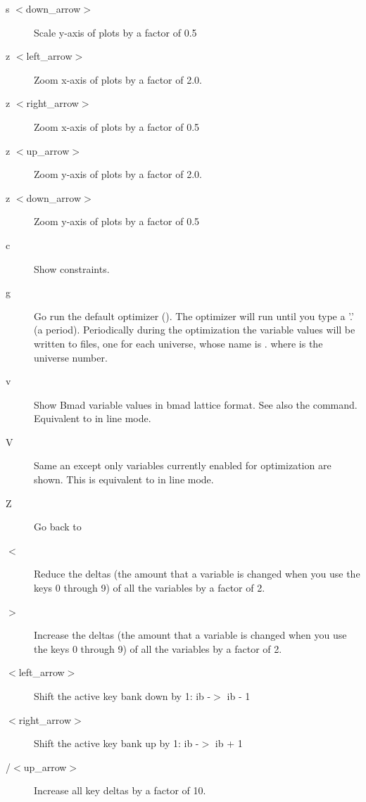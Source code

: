 {\begin{description}
\item[s $<$down\_arrow$>$]
Scale y-axis of plots by a factor of 0.5


\item[z $<$left\_arrow$>$]
Zoom x-axis of plots by a factor of 2.0.

\item[z $<$right\_arrow$>$]
Zoom x-axis of plots by a factor of 0.5

\item[z $<$up\_arrow$>$]
Zoom y-axis of plots by a factor of 2.0.

\item[z $<$down\_arrow$>$]
Zoom y-axis of plots by a factor of 0.5

\item[c]  
Show constraints.

\item[g]
Go run the default optimizer (). The optimizer will run until you type a '.' (a
period).  Periodically during the optimization the variable values will be written to files, one for
each universe, whose name is . where \vn{\#} is the universe number.

\item[v]
Show Bmad variable values in bmad lattice format. See also the  command. Equivalent to
 in line mode.

\item[V] 
Same an  except only variables currently enabled for optimization are shown.
This is equivalent to  in line mode.

\item[Z] 
Go back to 

\item[$<$]
Reduce the deltas (the amount that a variable is changed when you use
the keys 0 through 9) of all the variables by a factor of 2.

\item[$>$]
Increase the deltas (the amount that a variable is changed when you
use the keys 0 through 9) of all the variables by a factor of 2.

\item[$<$left\_arrow$>$]
Shift the active key bank down by 1: ib -$>$ ib - 1

\item[$<$right\_arrow$>$]
Shift the active key bank up by 1: ib -$>$ ib + 1

\item[/$<$up\_arrow$>$]
Increase all key deltas by a factor of 10.


\end{description}}
